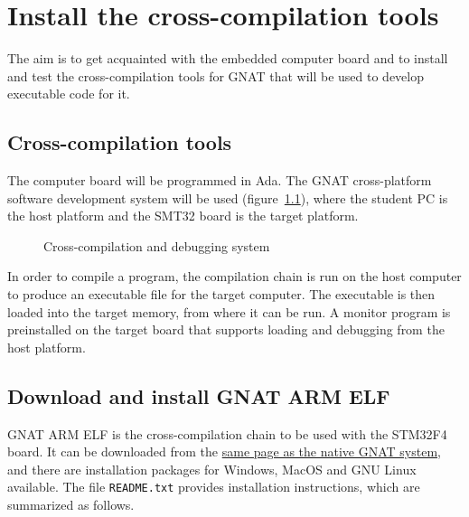 \chapter{Install the cross-compilation tools}\label{ch:Assignment2}

The aim is to get acquainted with the embedded computer board and to install and test the cross-compilation tools for GNAT that will be used to develop executable code for it.

\section{Cross-compilation tools}

The computer board will be programmed in Ada. The GNAT cross-platform software development system will be used (figure~\ref{fig:cross}), where the student PC is the host platform and the SMT32 board is the target platform.

\begin{figure}[h]
            \caption{Cross-compilation and debugging system}
            \label{fig:cross}
\end{figure}

In order to compile a program, the compilation chain is run on the host computer to produce an executable file for the target computer. The executable is then loaded into the target memory, from where it can be run. A monitor program is preinstalled on the target board that supports loading and debugging from the host platform.

\section{Download and install GNAT ARM ELF}

GNAT ARM ELF is the cross-compilation chain to be used with the STM32F4 board. It can be downloaded from the
\href{https://www.adacore.com/download/more}{same page as the native GNAT system},
and there are installation packages for Windows, MacOS and GNU Linux available.
The file \texttt{README.txt} provides installation instructions,
which are summarized as follows.


